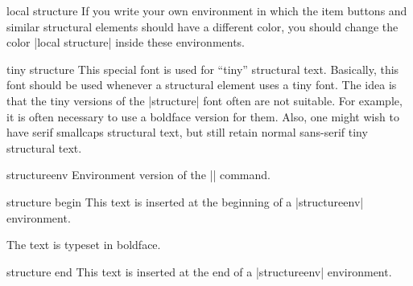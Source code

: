\begin{command}{\structure{}}
\begin{element}{local structure}
    If you write your own environment in which the item buttons and
    similar structural elements should have a different color, you
    should change the color |local structure| inside these
    environments.
  \end{element}

  \begin{element}{tiny structure}\no\no\yes
    This special font is used for ``tiny'' structural text. Basically,
    this font should be used whenever a structural element uses a tiny
    font. The idea is that the tiny versions of the |structure| font
    often are not suitable. For example, it is often necessary to use a
    boldface version for them. Also, one might wish to have serif smallcaps
    structural text, but still retain normal sans-serif tiny structural
    text.
  \end{element}
\end{command}

\begin{environment}{{structureenv}}
  Environment version of the |\structure| command.

  \begin{element}{structure begin}\yes\no\no
    This text is inserted at the beginning of a |structureenv|
    environment.

    \begin{templateoptions}

      \articlenote
      The text is typeset in boldface.
    \end{templateoptions}
  \end{element}

  \begin{element}{structure end}\yes\no\no
    This text is inserted at the end of a |structureenv| environment.
  \end{element}
\end{environment}


